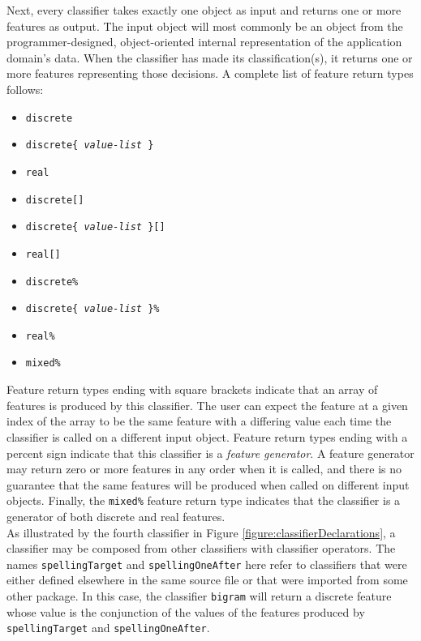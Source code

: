 Next, every classifier takes exactly one object as input and returns one or
more features as output.  The input object will most commonly be an object
from the programmer-designed, object-oriented internal representation of the
application domain's data.  When the classifier has made its
classification(s), it returns one or more features representing those
decisions.  A complete list of feature return types follows:

\begin{itemize}
\item {\tt discrete}
\item {\tt discrete\{ \emph{value-list} \}}
\item {\tt real}
\item {\tt discrete[]}
\item {\tt discrete\{ \emph{value-list} \}[]}
\item {\tt real[]}
\item {\tt discrete\%}
\item {\tt discrete\{ \emph{value-list} \}\%}
\item {\tt real\%}
\item {\tt mixed\%}
\end{itemize}

Feature return types ending with square brackets indicate that an array of
features is produced by this classifier.  The user can expect the feature at a
given index of the array to be the same feature with a differing value each
time the classifier is called on a different input object.  Feature return
types ending with a percent sign indicate that this classifier is a
\emph{feature generator}.  A feature generator may return zero or more
features in any order when it is called, and there is no guarantee that the
same features will be produced when called on different input objects.
Finally, the {\tt mixed\%} feature return type indicates that the classifier
is a generator of both discrete and real features. \\

As illustrated by the fourth classifier in Figure
\ref{figure:classifierDeclarations}, a classifier may be composed from other
classifiers with classifier operators.  The names {\tt spellingTarget} and
{\tt spellingOneAfter} here refer to classifiers that were either defined
elsewhere in the same source file or that were imported from some other
package.  In this case, the classifier {\tt bigram} will return a discrete
feature whose value is the conjunction of the values of the features produced
by {\tt spellingTarget} and {\tt spellingOneAfter}. \\

